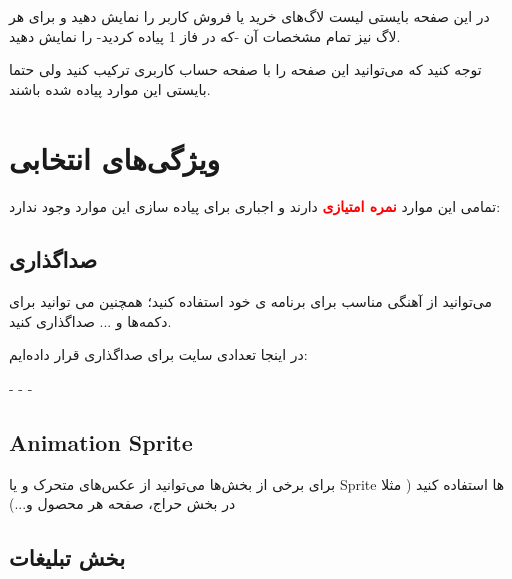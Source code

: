 \documentclass[]{article}
\begin{document}
در این صفحه بایستی لیست لاگ‌های خرید یا فروش کاربر را نمایش دهید و برای هر لاگ نیز تمام مشخصات آن -که در فاز 1 پیاده کردید- را نمایش دهید.

توجه کنید که می‌توانید این صفحه را با صفحه حساب کاربری ترکیب کنید ولی حتما بایستی این موارد پیاده شده باشند.


\newpage



\section*{{\titr ویژگی‌های انتخابی }}

تمامی این موارد
\textbf{\textcolor{red}{نمره امتیازی}}
  دارند و اجباری برای پیاده سازی این موارد وجود ندارد:


\subsection*{{\titr صداگذاری }}


می‌توانید از آهنگی مناسب برای برنامه ی خود استفاده کنید؛ همچنین می توانید برای دکمه‌ها و ...
صداگذاری کنید.


در اینجا تعدادی سایت برای صداگذاری قرار داده‌ایم:

\href{https://www.kenney.nl/assets/impact-sounds}{\textcolor{blue}{\underline{}}}
 -
  \href{https://www.kenney.nl/assets/digital-audio}{\textcolor{blue}{\underline{}}}
   -
    \href{https://www.kenney.nl/assets/ui-audio}{\textcolor{blue}{\underline{}}}
    -
     \href{https://www.zapsplat.com/}{\textcolor{blue}{\underline{}}}


\subsection*{{\titr Animation Sprite  }}

برای برخی از بخش‌ها می‌توانید از عکس‌های متحرک و یا Sprite ها استفاده کنید ( مثلا در بخش حراج، صفحه هر محصول و...)

\subsection*{{\titr بخش تبلیغات  }}
\end{document}
